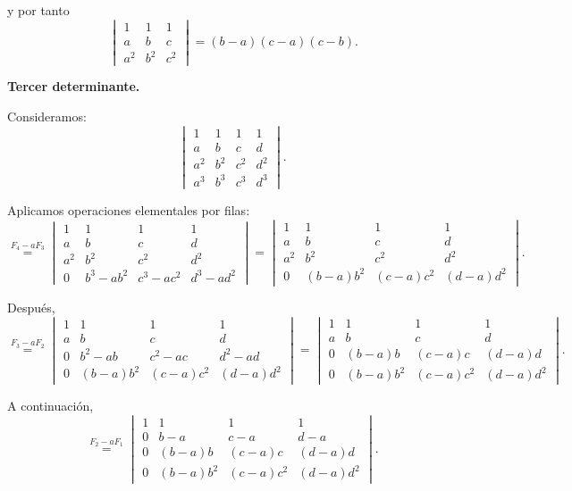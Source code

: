 \documentclass[a4paper,12pt]{article}
\begin{document}
\begin{ejercicio}[title=Ejercicio 34]
y por tanto
\[
\boxed{\,\begin{vmatrix}
1 & 1 & 1\\
a & b & c\\
a^2 & b^2 & c^2
\end{vmatrix}
= (b-a)(c-a)(c-b).}
\]

\textbf{Tercer determinante.}

Consideramos:
\[
\begin{vmatrix}
1 & 1 & 1 & 1\\
a & b & c & d\\
a^2 & b^2 & c^2 & d^2\\
a^3 & b^3 & c^3 & d^3
\end{vmatrix}.
\]

Aplicamos operaciones elementales por filas:
\[
\overset{F_4-aF_3}{=}
\begin{vmatrix}
1 & 1 & 1 & 1\\
a & b & c & d\\
a^2 & b^2 & c^2 & d^2\\
0 & b^3-ab^2 & c^3-ac^2 & d^3-ad^2
\end{vmatrix}
=
\begin{vmatrix}
1 & 1 & 1 & 1\\
a & b & c & d\\
a^2 & b^2 & c^2 & d^2\\
0 & (b-a)b^2 & (c-a)c^2 & (d-a)d^2
\end{vmatrix}.
\]

Después,
\[
\overset{F_3-aF_2}{=}
\begin{vmatrix}
1 & 1 & 1 & 1\\
a & b & c & d\\
0 & b^2-ab & c^2-ac & d^2-ad\\
0 & (b-a)b^2 & (c-a)c^2 & (d-a)d^2
\end{vmatrix}
=
\begin{vmatrix}
1 & 1 & 1 & 1\\
a & b & c & d\\
0 & (b-a)b & (c-a)c & (d-a)d\\
0 & (b-a)b^2 & (c-a)c^2 & (d-a)d^2
\end{vmatrix}.
\]

A continuación,
\[
\overset{F_2-aF_1}{=}
\begin{vmatrix}
1 & 1 & 1 & 1\\
0 & b-a & c-a & d-a\\
0 & (b-a)b & (c-a)c & (d-a)d\\
0 & (b-a)b^2 & (c-a)c^2 & (d-a)d^2
\end{vmatrix}.
\]


\end{ejercicio}
\end{document}
